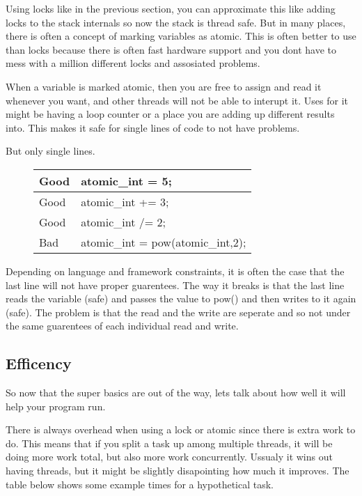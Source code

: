 \documentclass[12pt]{article}
\begin{document}
Using locks like in the previous section, you can approximate this like adding locks to the stack internals so now the stack is thread safe.
But in many places, there is often a concept of marking variables as atomic.
This is often better to use than locks because there is often fast hardware support and you dont have to mess with a million different locks and assosiated problems.

When a variable is marked atomic, then you are free to assign and read it whenever you want, and other threads will not be able to interupt it.
Uses for it might be having a loop counter or a place you are adding up different results into.
This makes it safe for single lines of code to not have problems.

But only single lines.

\begin{figure}[htb]
	\centering
	\begin{tabular}{|l|l|}
		\hline
		Good & atomic\_int = 5; \\ \hline
		Good & atomic\_int += 3; \\ \hline
		Good & atomic\_int /= 2; \\ \hline
		Bad & atomic\_int = pow(atomic\_int,2); \\ \hline
	\end{tabular}
\end{figure}

Depending on language and framework constraints, it is often the case that the last line will not have proper guarentees.
The way it breaks is that the last line reads the variable (safe) and passes the value to pow() and then writes to it again (safe).
The problem is that the read and the write are seperate and so not under the same guarentees of each individual read and write.

\subsection{Efficency}

So now that the super basics are out of the way, lets talk about how well it will help your program run.

There is always overhead when using a lock or atomic since there is extra work to do.
This means that if you split a task up among multiple threads, it will be doing more work total, but also more work concurrently.
Ussualy it wins out having threads, but it might be slightly disapointing how much it improves.
The table below shows some example times for a hypothetical task.
\end{document}
